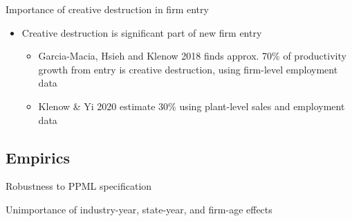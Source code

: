 \documentclass[english,usenames,dvipsnames]{beamer}
\begin{document}
\begin{frame}{Importance of creative destruction in firm entry}\label{motivation:importance_of_creative_destruction}
	\hyperlink{motivation_background}{}
	\begin{itemize}
		\item Creative destruction is significant part of new firm entry
		\begin{itemize}
			\item Garcia-Macia, Hsieh and Klenow 2018 finds approx. 70\% of productivity growth from entry is creative destruction, using firm-level employment data
			\item Klenow \& Yi 2020 estimate 30\% using plant-level sales and employment data
		\end{itemize}
	\end{itemize}
\end{frame}


\subsection{Empirics}

\begin{frame}{Robustness to PPML specification}
	\label{empirics:ppmlRegressions}
	\hyperlink{empirics:mainRegression}{}
	\begin{table}
		\scriptsize
		\centering
		
		\caption{\scriptsize The dependent variable is average yearly number of founders joining WSOs (4-digit NAICS) in years $t+1,t+2,t+3$. The independent variables are averages over $t,t-1,t-2$. Standard errors are clustered at the firm level. Column 1 uses firm-, industry-age, industry-year, and state-year fixed effects, but no controls. Column 2 uses no fixed effects, but has firm controls given by Tobin's Q and the logarithm of employment, assets, intangible assets, investment, net income, sales, cumulative citation-weighted patents. Column 3 uses both.}
	\end{table}
\end{frame}

\begin{frame}{Unimportance of industry-year, state-year, and firm-age effects}
	\label{empirics:ppmlRegressions2}
	\hyperlink{empirics:mainRegression}{}
	\begin{table}
		\scriptsize
		\centering
		
		\caption{\scriptsize The dependent variable is average yearly number of founders joining WSOs (4-digit NAICS) in years $t+1,t+2,t+3$. The independent variables are averages over $t,t-1,t-2$. Standard errors are clustered at the firm level.}
	\end{table}
\end{frame}
\end{document}
